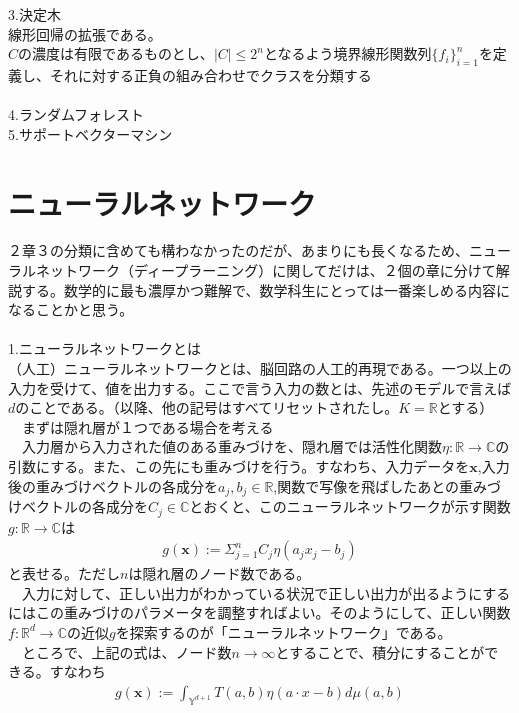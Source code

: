 \documentclass{jsarticle}
\begin{document}
3.決定木\\
線形回帰の拡張である。\\
$C$の濃度は有限であるものとし、$|C|\leq 2^n$となるよう境界線形関数列$\{f_i\}_{i=1}^n$を定義し、それに対する正負の組み合わせでクラスを分類する\\
　\\
4.ランダムフォレスト\\

5.サポートベクターマシン\\


\newpage
\section{ニューラルネットワーク}
２章３の分類に含めても構わなかったのだが、あまりにも長くなるため、ニューラルネットワーク（ディープラーニング）に関してだけは、２個の章に分けて解説する。数学的に最も濃厚かつ難解で、数学科生にとっては一番楽しめる内容になることかと思う。\\
　\\
1.ニューラルネットワークとは\\
 （人工）ニューラルネットワークとは、脳回路の人工的再現である。一つ以上の入力を受けて、値を出力する。ここで言う入力の数とは、先述のモデルで言えば$d$のことである。（以降、他の記号はすべてリセットされたし。$K=\mathbb{R}$とする）\\
　まずは隠れ層が１つである場合を考える\\
　入力層から入力された値のある重みづけを、隠れ層では活性化関数$\eta:\mathbb{R}\rightarrow \mathbb{C}$の引数にする。また、この先にも重みづけを行う。すなわち、入力データを$\bm{x}$,入力後の重みづけベクトルの各成分を$a_j,b_j\in\mathbb{R}$,関数で写像を飛ばしたあとの重みづけベクトルの各成分を$C_j\in\mathbb{C}$とおくと、このニューラルネットワークが示す関数$g:\mathbb{R}\rightarrow\mathbb{C}$は
\begin{eqnarray}
g(\bm{x}):=\Sigma_{j=1}^nC_j\eta(a_jx_j-b_j)
\end{eqnarray}
と表せる。ただし$n$は隠れ層のノード数である。\\
　入力に対して、正しい出力がわかっている状況で正しい出力が出るようにするにはこの重みづけのパラメータを調整すればよい。そのようにして、正しい関数$f:\mathbb{R}^d\rightarrow\mathbb{C}$の近似$g$を探索するのが「ニューラルネットワーク」である。\\
　ところで、上記の式は、ノード数$n\rightarrow\infty$とすることで、積分にすることができる。すなわち
\begin{eqnarray}
g(\bm{x}):=\int_{\mathbb{Y}^{d+1}}T(a,b)\eta(a\cdot x-b)d\mu(a,b)
\end{eqnarray}
\end{document}
